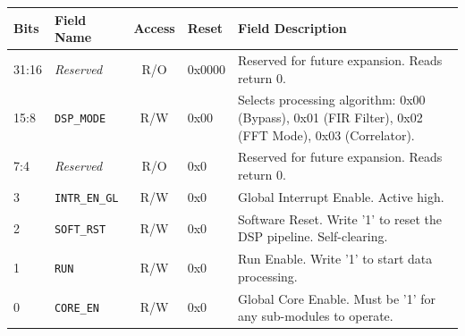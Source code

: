 \noindent
\begin{tabularx}{\textwidth}{l l c l X}
\toprule
\textbf{Bits} & \textbf{Field Name} & \textbf{Access} & \textbf{Reset} & \textbf{Field Description} \\
\midrule
31:16 & \textit{Reserved} & R/O & 0x0000 & Reserved for future expansion. Reads return 0. \\
15:8  & \texttt{DSP\_MODE} & R/W & 0x00 & Selects processing algorithm: 0x00 (Bypass), 0x01 (FIR Filter), 0x02 (FFT Mode), 0x03 (Correlator). \\
7:4   & \textit{Reserved} & R/O & 0x0 & Reserved for future expansion. Reads return 0. \\
3     & \texttt{INTR\_EN\_GL} & R/W & 0x0 & Global Interrupt Enable. Active high. \\
2     & \texttt{SOFT\_RST} & R/W & 0x0 & Software Reset. Write '1' to reset the DSP pipeline. Self-clearing. \\
1     & \texttt{RUN} & R/W & 0x0 & Run Enable. Write '1' to start data processing. \\
0     & \texttt{CORE\_EN} & R/W & 0x0 & Global Core Enable. Must be '1' for any sub-modules to operate. \\
\bottomrule
\end{tabularx}

